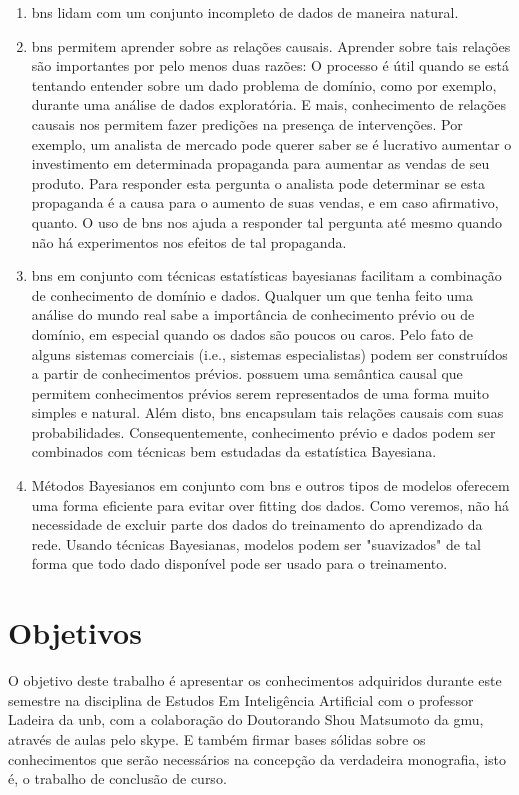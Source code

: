 \begin{enumerate}
	\item \glspl{bn} lidam com um conjunto incompleto de dados de maneira natural.

	\item \glspl{bn} permitem aprender sobre as relações causais. Aprender sobre tais relações são importantes por pelo menos duas razões: O processo é útil quando se está tentando entender sobre um dado problema de domínio, como por exemplo, durante uma análise de dados exploratória.  E mais, conhecimento de relações causais nos permitem fazer predições na presença de intervenções. Por exemplo, um analista de mercado pode querer saber se é lucrativo aumentar o investimento em determinada propaganda para aumentar as vendas de seu produto. Para responder esta pergunta o analista pode determinar se esta propaganda é a causa para o aumento de suas vendas, e em caso afirmativo, quanto. O uso de \glspl{bn} nos ajuda a responder tal pergunta até mesmo quando não há experimentos nos efeitos de tal propaganda.
	
	\item \glspl{bn} em conjunto com técnicas estatísticas bayesianas facilitam a combinação de conhecimento de domínio e dados. Qualquer um que tenha feito uma análise do mundo real sabe a importância de conhecimento prévio ou de domínio, em especial quando os dados são poucos ou caros. Pelo fato de alguns sistemas comerciais (i.e., sistemas especialistas) podem ser construídos a partir de conhecimentos prévios.  possuem uma semântica causal que permitem conhecimentos prévios serem representados de uma forma muito simples e natural. Além disto, \glspl{bn} encapsulam tais relações causais com suas probabilidades. Consequentemente, conhecimento prévio e dados podem ser combinados com técnicas bem estudadas da estatística Bayesiana.
	
	\item Métodos Bayesianos em conjunto com \glspl{bn} e outros tipos de modelos oferecem uma forma eficiente para evitar over fitting dos dados. Como veremos, não há necessidade de excluir parte dos dados do treinamento do aprendizado da rede. Usando técnicas Bayesianas, modelos podem ser "suavizados" de tal forma que todo dado disponível pode ser usado para o treinamento.

\end{enumerate}

\section{Objetivos}
O objetivo deste trabalho é apresentar os conhecimentos adquiridos durante este semestre na disciplina de Estudos Em Inteligência Artificial com o professor Ladeira da \gls{unb}, com a colaboração do Doutorando Shou Matsumoto da \gls{gmu}, através de aulas pelo skype. E também firmar bases sólidas sobre os conhecimentos que serão necessários na concepção da verdadeira monografia, isto é, o trabalho de conclusão de curso.


